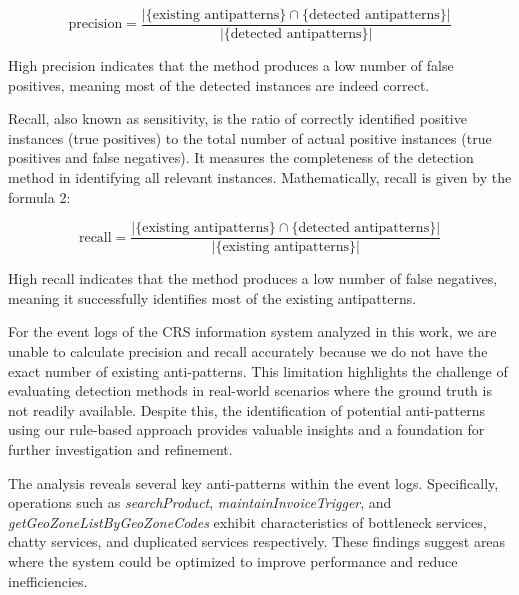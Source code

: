 \documentclass[12pt, times]{article}
\begin{document}
	\begin{equation}
		\text{precision} = \frac{\left| \{ \text{existing antipatterns} \} \cap \{ \text{detected antipatterns} \} \right|}{\left| \{ \text{detected antipatterns} \} \right|}
	\end{equation}
	
	\hspace*{5mm} High precision indicates that the method produces a low number of false positives, meaning most of the detected instances are indeed correct.
	
	\hspace*{5mm} Recall, also known as sensitivity, is the ratio of correctly identified positive instances (true positives) to the total number of actual positive instances (true positives and false negatives). It measures the completeness of the detection method in identifying all relevant instances. Mathematically, recall is given by the formula 2:
	
	\begin{equation}
		\text{recall} = \frac{\left| \{ \text{existing antipatterns} \} \cap \{ \text{detected antipatterns} \} \right|}{\left| \{ \text{existing antipatterns} \} \right|}
	\end{equation}
	
	\hspace*{5mm} High recall indicates that the method produces a low number of false negatives, meaning it successfully identifies most of the existing antipatterns.
	
	\hspace*{5mm} For the event logs of the CRS information system analyzed in this work, we are unable to calculate precision and recall accurately because we do not have the exact number of existing anti-patterns. This limitation highlights the challenge of evaluating detection methods in real-world scenarios where the ground truth is not readily available. Despite this, the identification of potential anti-patterns using our rule-based approach provides valuable insights and a foundation for further investigation and refinement.
	
	
	\hspace*{5mm} The analysis reveals several key anti-patterns within the event logs. Specifically, operations such as \textit{searchProduct}, \textit{maintainInvoiceTrigger}, and \textit{getGeoZoneListByGeoZoneCodes} exhibit characteristics of bottleneck services, chatty services, and duplicated services respectively. These findings suggest areas where the system could be optimized to improve performance and reduce inefficiencies.
	
\end{document}
